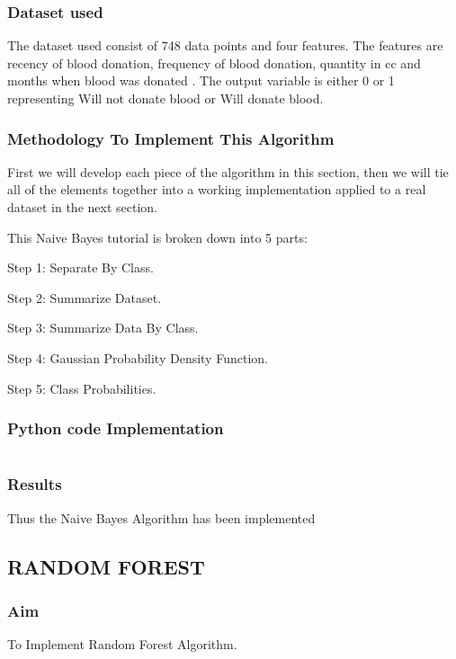 \documentclass[12pt,a4paper]{article}
\begin{document}
\subsubsection{Dataset used}

\quad \quad The dataset used consist of 748 data points and four features. The features are recency of blood donation, frequency of blood donation, quantity in cc and months when blood was donated . The output variable is either 0 or 1 representing Will not donate blood or Will donate blood.

\subsubsection{Methodology To Implement This Algorithm}

\quad \quad First we will develop each piece of the algorithm in this section, then we will tie all of the elements together into a working implementation applied to a real dataset in the next section. 

\quad This Naive Bayes tutorial is broken down into 5 parts: 

\quad     Step 1: Separate By Class. 

\quad     Step 2: Summarize Dataset. 

\quad     Step 3: Summarize Data By Class. 

\quad     Step 4: Gaussian Probability Density Function. 

\quad     Step 5: Class Probabilities. 
   

\subsubsection{Python code Implementation}


\inputminted[breaklines,breakafter=d,  style=perldoc]{python}{{./pythonFile/Q_v.py}}


\subsubsection{Results}

\quad \quad Thus the Naive Bayes Algorithm has been implemented


\newpage


\subsection{RANDOM FOREST}

\subsubsection{Aim}
\quad \quad To Implement Random Forest Algorithm.
\end{document}

